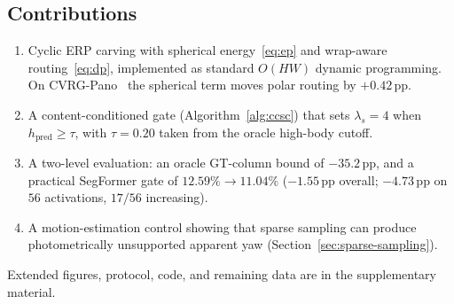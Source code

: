 \subsection{Contributions}
\begin{enumerate}
  \item Cyclic ERP carving with spherical energy~\eqref{eq:ep}
  and wrap-aware routing~\eqref{eq:dp}, implemented as standard
  $O(HW)$ dynamic programming. On
  {CVRG-Pano}~\cite{orhan2021semantic} the spherical term moves
  polar routing by $+0.42$\,pp.

  \item A content-conditioned gate (Algorithm~\ref{alg:ccsc})
  that sets $\lambda_s=4$ when $h_{\mathrm{pred}}\ge\tau$, with
  $\tau=0.20$ taken from the oracle high-body cutoff.

  \item A two-level evaluation: an oracle GT-column bound of
  $-35.2$\,pp, and a practical SegFormer gate of
  $12.59\%\rightarrow 11.04\%$ ($-1.55$\,pp overall;
  $-4.73$\,pp on $56$ activations, $17/56$ increasing).

  \item A motion-estimation control showing that sparse
  sampling can produce photometrically unsupported apparent yaw
  (Section~\ref{sec:sparse-sampling}).
\end{enumerate}
Extended figures, protocol, code, and remaining data are in the
supplementary material.
